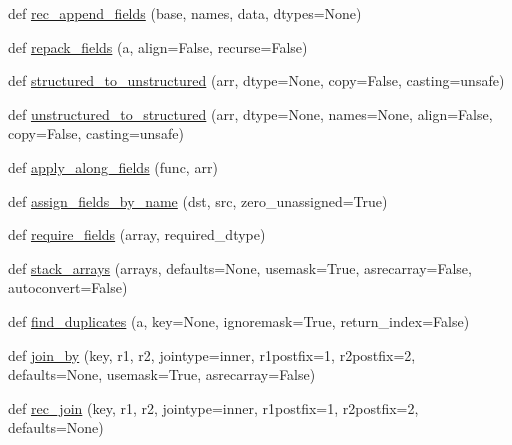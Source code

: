 \begin{DoxyCompactItemize}
\item 
def \hyperlink{namespacenumpy_1_1lib_1_1recfunctions_abd5e0ba26439a27ef66bbe78021f52a1}{rec\+\_\+append\+\_\+fields} (base, names, data, dtypes=None)
\item 
def \hyperlink{namespacenumpy_1_1lib_1_1recfunctions_ab8fc8e3af3c0a7ef3802c6d38e529bf7}{repack\+\_\+fields} (a, align=False, recurse=False)
\item 
def \hyperlink{namespacenumpy_1_1lib_1_1recfunctions_a55c8ffb5824a0a25bfd52f2b0fb446bf}{structured\+\_\+to\+\_\+unstructured} (arr, dtype=None, copy=False, casting=\textquotesingle{}unsafe\textquotesingle{})
\item 
def \hyperlink{namespacenumpy_1_1lib_1_1recfunctions_a7c256112f27f43cd7d6b581c9c2f1c46}{unstructured\+\_\+to\+\_\+structured} (arr, dtype=None, names=None, align=False, copy=False, casting=\textquotesingle{}unsafe\textquotesingle{})
\item 
def \hyperlink{namespacenumpy_1_1lib_1_1recfunctions_ae04a050fda938849310c5f8d7d22a79d}{apply\+\_\+along\+\_\+fields} (func, arr)
\item 
def \hyperlink{namespacenumpy_1_1lib_1_1recfunctions_aa1a4060efb8b5a93328a95d3b6771163}{assign\+\_\+fields\+\_\+by\+\_\+name} (dst, src, zero\+\_\+unassigned=True)
\item 
def \hyperlink{namespacenumpy_1_1lib_1_1recfunctions_ac2697fba5b0b645c4e6328b1c113e921}{require\+\_\+fields} (array, required\+\_\+dtype)
\item 
def \hyperlink{namespacenumpy_1_1lib_1_1recfunctions_a79ff6ab96bbc7e0764d3754dedd7bf28}{stack\+\_\+arrays} (arrays, defaults=None, usemask=True, asrecarray=False, autoconvert=False)
\item 
def \hyperlink{namespacenumpy_1_1lib_1_1recfunctions_a1f60f45e1fe362422c163394be3ad363}{find\+\_\+duplicates} (a, key=None, ignoremask=True, return\+\_\+index=False)
\item 
def \hyperlink{namespacenumpy_1_1lib_1_1recfunctions_a71d156563fd708ee8342cd1ed16d44ae}{join\+\_\+by} (key, r1, r2, jointype=\textquotesingle{}inner\textquotesingle{}, r1postfix=\textquotesingle{}1\textquotesingle{}, r2postfix=\textquotesingle{}2\textquotesingle{}, defaults=None, usemask=True, asrecarray=False)
\item 
def \hyperlink{namespacenumpy_1_1lib_1_1recfunctions_a54a0e3181236b7bc9985221ca6763569}{rec\+\_\+join} (key, r1, r2, jointype=\textquotesingle{}inner\textquotesingle{}, r1postfix=\textquotesingle{}1\textquotesingle{}, r2postfix=\textquotesingle{}2\textquotesingle{}, defaults=None)
\end{DoxyCompactItemize}


